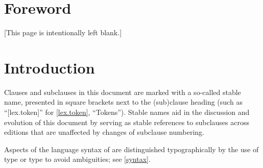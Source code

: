 
\chapter{Foreword}

[This page is intentionally left blank.]

\chapter{Introduction}

Clauses and subclauses in this document are marked
with a so-called stable name,
presented in square brackets next to the (sub)clause heading
(such as ``[lex.token]'' for \ref{lex.token}, ``Tokens'').
Stable names aid in the discussion and evolution of this document
by serving as stable references to subclauses across editions
that are unaffected by changes of subclause numbering.

Aspects of the language syntax of \Cpp{} are distinguished typographically
by the use of  type
or  type to avoid ambiguities; see \ref{syntax}.
